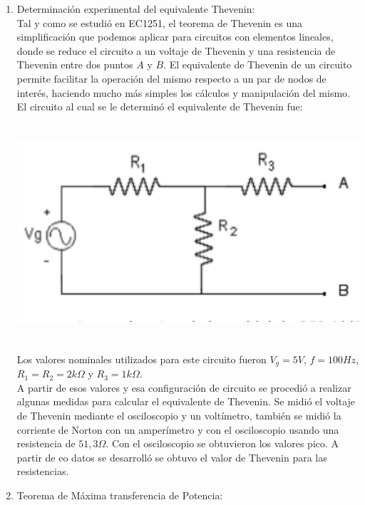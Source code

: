 \documentclass[12pt]{article}
\begin{document}
	\begin{enumerate}
		
		\item Determinación experimental del equivalente Thevenin:\\
		
		Tal y como se estudió en EC1251, el teorema de Thevenin es una simplificación que podemos aplicar para circuitos con elementos lineales, donde se reduce el circuito a un voltaje de Thevenin y una resistencia de Thevenin entre dos puntos $A$ y $B$. El equivalente de Thevenin de un circuito permite facilitar la operación del mismo respecto a un par de nodos de interés, haciendo mucho más simples los cálculos y manipulación del mismo. El circuito al cual se le determinó el equivalente de Thevenin fue:
		
		\begin{center}
			\includegraphics[width=16cm,height=8cm]{Img/circ_1}
		\end{center}
		
		Los valores nominales utilizados para este circuito fueron $V_g = 5V$, $f = 100Hz$, $R_1 = R_2 = 2k\Omega$ y $R_3 = 1k\Omega$.\\
		
		A partir de esos valores y esa configuración de circuito se procedió a realizar algunas medidas para calcular el equivalente de Thevenin. Se midió el voltaje de Thevenin mediante el osciloscopio y un voltímetro, también se midió la corriente de Norton con un amperímetro y con el osciloscopio usando una resistencia de $51,3\Omega$. Con el osciloscopio se obtuvieron los valores pico. A partir de eo datos se desarrolló se obtuvo el valor de Thevenin para las resistencias.\\
		
		\item Teorema de Máxima transferencia de Potencia:\\
		

\end{enumerate}
\end{document}
